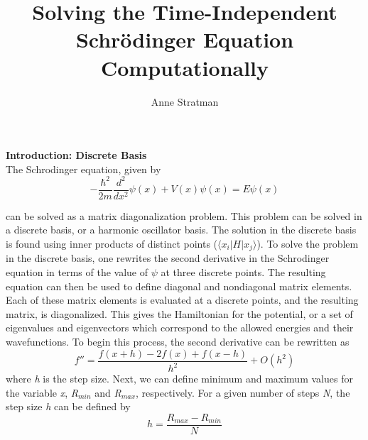 \documentclass[%
 reprint,
 amsmath,amssymb,
 aps,
]{revtex4-1}
\begin{document}



\title{Solving the Time-Independent Schr\"{o}dinger Equation Computationally}

\author{Anne Stratman}
%

\maketitle								%





\noindent \textbf{Introduction: Discrete Basis}\\

\noindent The Schrodinger equation, given by
\begin{equation}
-\frac{\hbar^2}{2m}\frac{d^2}{dx^2}\psi(x)+V(x)\psi(x)=E\psi(x)
\end{equation}

\noindent can be solved as a matrix diagonalization problem.  This problem can be solved in a discrete basis, or a harmonic oscillator basis.  The solution in the discrete basis is found using inner products of distinct points ($\langle x_i|H|x_j\rangle$).  To solve the problem in the discrete basis, one rewrites the second derivative in the Schrodinger equation in terms of the value of $\psi$ at three discrete points.  The resulting equation can then be used to define diagonal and nondiagonal matrix elements.  Each of these matrix elements is evaluated at a discrete points, and the resulting matrix, is diagonalized.  This gives the Hamiltonian for the potential, or a set of eigenvalues and eigenvectors which correspond to the allowed energies and their wavefunctions.  To begin this process, the second derivative can be rewritten as
\begin{equation}
f''=\frac{f(x+h)-2f(x)+f(x-h)}{h^2}+O(h^2)
\end{equation}
\noindent where \textit{h} is the step size.  Next, we can define minimum and maximum values for the variable \textit{x}, \textit{R}$_{min}$ and \textit{R}$_{max}$, respectively.  For a given number of steps \textit{N}, the step size \textit{h} can be defined by
\begin{equation}
h=\frac{R_{max}-R_{min}}{N}
\end{equation}
\end{document}
